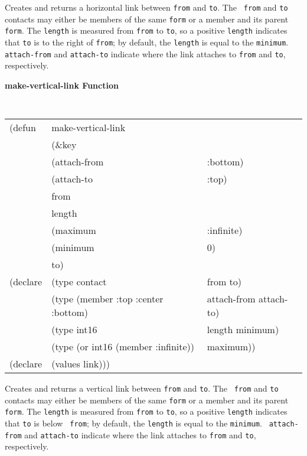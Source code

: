 \begin{flushright} \parbox[t]{6.125in}{ 

Creates and returns a horizontal link between {\tt from} and {\tt to}.  The {\tt
from} and {\tt to} contacts may either be members of the same {\tt form} or a
member and its parent {\tt form}.  The {\tt length} is measured from {\tt from}
to {\tt to}, so a positive {\tt length} indicates that {\tt to} is to the right
of {\tt from};  by default, the {\tt length} is equal to the {\tt minimum}. {\tt
attach-from} and {\tt attach-to}
indicate where the link attaches to {\tt from} and {\tt to}, respectively.  


}\end{flushright}


{\samepage
{\large {\bf make-vertical-link \hfill Function}} 
\begin{flushright} 
\parbox[t]{6.125in}{
\tt
\begin{tabular}{lll}
\raggedright
(defun & make-vertical-link & \\
&	  (\&key \\
&	   (attach-from & :bottom) \\
&	   (attach-to   & :top) \\
&	   from \\
&	   length      &  \\
&	   (maximum     & :infinite) \\
&	   (minimum     & 0) \\
&	   to) \\
(declare & (type contact &                        from to)\\
&	    (type (member :top :center :bottom) & attach-from attach-to) \\
&	    (type int16	&			 length minimum) \\
&	    (type (or int16 (member :infinite))	& maximum)) \\
(declare &(values link)))
\end{tabular}
\rm

}\end{flushright}}

\begin{flushright} \parbox[t]{6.125in}{ 

Creates and returns a vertical link between {\tt from} and {\tt to}.  The {\tt
from} and {\tt to} contacts may either be members of the same {\tt form} or a
member and its parent {\tt form}.  The {\tt length} is measured from {\tt from}
to {\tt to}, so a positive {\tt length} indicates that {\tt to} is below {\tt
from};  by default, the {\tt length} is equal to the {\tt minimum}.  {\tt
attach-from} and {\tt attach-to} indicate where the link
attaches to {\tt from} and {\tt to}, respectively.  


}\end{flushright}

